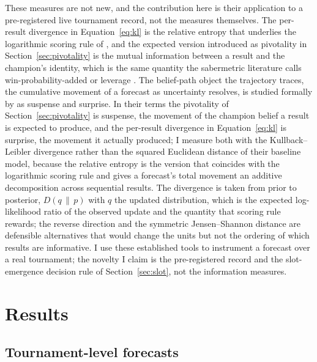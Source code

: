 \documentclass[11pt,letterpaper]{article}
\begin{document}
These measures are not new, and the contribution here is their application to a pre-registered live tournament record, not the measures themselves. The per-result divergence in Equation~\eqref{eq:kl} is the relative entropy that underlies the logarithmic scoring rule of \citet{gneiting2007}, and the expected version introduced as pivotality in Section~\ref{sec:pivotality} is the mutual information between a result and the champion's identity, which is the same quantity the sabermetric literature calls win-probability-added or leverage \citep{tango2007}. The belief-path object the trajectory traces, the cumulative movement of a forecast as uncertainty resolves, is studied formally by \citet{ely2015} as suspense and surprise. In their terms the pivotality of Section~\ref{sec:pivotality} is suspense, the movement of the champion belief a result is expected to produce, and the per-result divergence in Equation~\eqref{eq:kl} is surprise, the movement it actually produced; I measure both with the Kullback--Leibler divergence rather than the squared Euclidean distance of their baseline model, because the relative entropy is the version that coincides with the logarithmic scoring rule and gives a forecast's total movement an additive decomposition across sequential results. The divergence is taken from prior to posterior, $D(q \,\|\, p)$ with $q$ the updated distribution, which is the expected log-likelihood ratio of the observed update and the quantity that scoring rule rewards; the reverse direction and the symmetric Jensen--Shannon distance are defensible alternatives that would change the units but not the ordering of which results are informative. I use these established tools to instrument a forecast over a real tournament; the novelty I claim is the pre-registered record and the slot-emergence decision rule of Section~\ref{sec:slot}, not the information measures.



\section{Results}

\subsection{Tournament-level forecasts}
\end{document}
